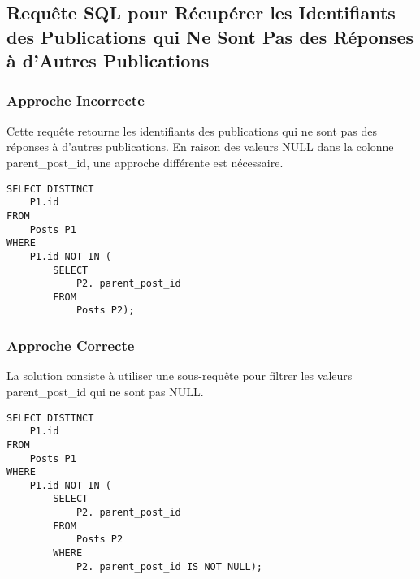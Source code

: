 \subsection{Requête SQL pour Récupérer les Identifiants des Publications qui Ne Sont Pas des Réponses à d'Autres Publications}
\subsubsection{Approche Incorrecte}

Cette requête retourne les identifiants des publications qui ne sont pas des réponses à d'autres publications. En raison des valeurs NULL dans la colonne parent\_post\_id, une approche différente est nécessaire.

\begin{lstlisting}
SELECT DISTINCT
    P1.id
FROM
    Posts P1
WHERE
    P1.id NOT IN (
        SELECT
            P2. parent_post_id
        FROM
            Posts P2);
\end{lstlisting}

\subsubsection{Approche Correcte}

La solution consiste à utiliser une sous-requête pour filtrer les valeurs parent\_post\_id qui ne sont pas NULL.

\begin{lstlisting}
SELECT DISTINCT
    P1.id
FROM
    Posts P1
WHERE
    P1.id NOT IN (
        SELECT
            P2. parent_post_id
        FROM
            Posts P2
        WHERE
            P2. parent_post_id IS NOT NULL);
\end{lstlisting}